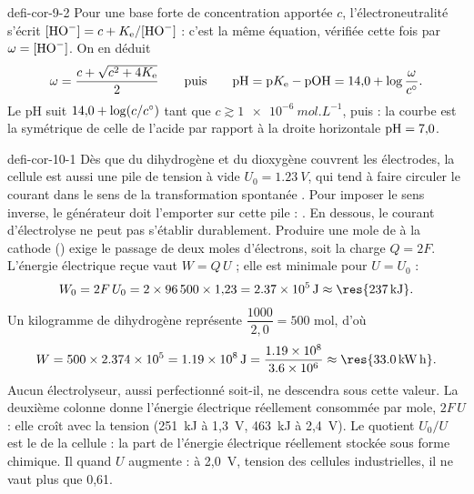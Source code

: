 \begin{blocEdition}{defi-cor-9-2}
\label{figedition-defi-cor-9-2-1}
Pour une base forte de concentration apportée $c$, l'électroneutralité s'écrit $[\ce{HO-}]=c+K_\mathrm{e}/[\ce{HO-}]$ :
c'est la même équation, vérifiée cette fois par $\omega=[\ce{HO-}]$. On en déduit
\[\omega=\frac{c+\sqrt{c^2+4K_\mathrm{e}}}{2}\qquad\text{puis}\qquad\mathrm{pH}=\mathrm{p}K_\mathrm{e}-\mathrm{pOH}=14{,}0+\log\frac{\omega}{c^{\circ}}.\]
Le pH suit $14{,}0+\log(c/c^{\circ})$ tant que $c\gtrsim\qty{1e-6}{mol.L^{-1}}$, puis  : la courbe est la symétrique de celle de l'acide par rapport à la droite horizontale $\mathrm{pH}=7{,}0$.
\end{blocEdition}

\begin{blocEdition}{defi-cor-10-1}
Dès que du dihydrogène et du dioxygène couvrent les électrodes, la cellule est aussi une pile de tension à vide
$U_0=\qty{1,23}{V}$, qui tend à faire circuler le courant dans le sens de la transformation spontanée
. Pour imposer le sens inverse, le générateur doit l'emporter sur cette pile :
. En dessous, le courant d'électrolyse ne peut pas s'établir durablement.
Produire une mole de  à la cathode () exige le passage de deux moles
d'électrons, soit la charge $Q=2F$. L'énergie électrique reçue vaut $W=Q\,U$ ; elle est minimale pour $U=U_0$ :
\[W_0=2F\,U_0=2\times\num{96500}\times1{,}23=\qty{2,37e5}{J}\approx\res{\qty{237}{kJ}}.\]
Un kilogramme de dihydrogène représente $\dfrac{1000}{2{,}0}=500$ mol, d'où
\[W=500\times\num{2.374e5}=\qty{1,19e8}{J}=\frac{\num{1.19e8}}{\num{3.6e6}}\approx\res{\qty{33,0}{kW.h}}.\]
Aucun électrolyseur, aussi perfectionné soit-il, ne descendra sous cette valeur.
La deuxième colonne donne l'énergie électrique réellement consommée par mole, $2F\,U$ : elle croît avec la tension
(251~kJ à 1,3~V, 463~kJ à 2,4~V). Le quotient $U_0/U$ est le  de la cellule : la part
de l'énergie électrique réellement stockée sous forme chimique. Il  quand $U$ augmente : à 2,0~V,
tension des cellules industrielles, il ne vaut plus que 0,61.
\end{blocEdition}

